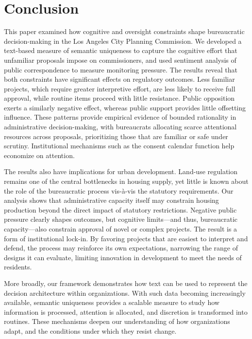 \section{Conclusion}\label{sec_conclusion}

This paper examined how cognitive and oversight constraints shape bureaucratic decision-making in the Los Angeles City Planning Commission. We developed a text-based measure of semantic uniqueness to capture the cognitive effort that unfamiliar proposals impose on commissioners, and used sentiment analysis of public correspondence to measure monitoring pressure. The results reveal that both constraints have significant effects on regulatory outcomes. Less familiar projects, which require greater interpretive effort, are less likely to receive full approval, while routine items proceed with little resistance. Public opposition exerts a similarly negative effect, whereas public support provides little offsetting influence. These patterns provide empirical evidence of bounded rationality in administrative decision-making, with bureaucrats allocating scarce attentional resources across proposals, prioritizing those that are familiar or safe under scrutiny. Institutional mechanisms such as the consent calendar function help economize on attention.

The results also have implications for urban development. Land-use regulation remains one of the central bottlenecks in housing supply, yet little is known about the role of the bureaucratic process vis-\`a-vis the statutory requirements. Our analysis shows that administrative capacity itself may constrain housing production beyond the direct impact of statutory restrictions. Negative public pressure clearly shapes outcomes, but cognitive limits---and thus, bureaucratic capacity---also constrain approval of novel or complex projects. The result is a form of institutional lock-in. By favoring projects that are easiest to interpret and defend, the process may reinforce its own expectations, narrowing the range of designs it can evaluate, limiting innovation in development to meet the needs of residents.

More broadly, our framework demonstrates how text can be used to represent the decision architecture within organizations. With such data becoming increasingly available, semantic uniqueness provides a scalable measure to study how information is processed, attention is allocated, and discretion is transformed into routines. These mechanisms deepen our understanding of how organizations adapt, and the conditions under which they resist change.


\pagebreak